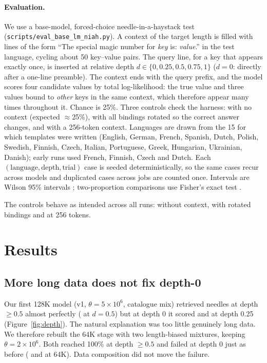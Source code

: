 \documentclass[11pt]{article}
\begin{document}
\paragraph{Evaluation.} We use a base-model, forced-choice needle-in-a-haystack test (\nolinkurl{scripts/eval_base_lm_niah.py}). A context of the target length is filled with lines of the form ``The special magic number for \emph{key} is: \emph{value}.'' in the test language, cycling about 50 key--value pairs. The query line, for a key that appears exactly once, is inserted at relative depth $d\in\{0, 0.25, 0.5, 0.75, 1\}$ ($d{=}0$: directly after a one-line preamble). The context ends with the query prefix, and the model scores four candidate values by total log-likelihood: the true value and three values bound to \emph{other} keys in the same context, which therefore appear many times throughout it. Chance is 25\%. Three controls check the harness: with no context (expected $\approx$25\%), with all bindings rotated so the correct answer changes, and with a 256-token context. Languages are drawn from the 15 for which templates were written (English, German, French, Spanish, Dutch, Polish, Swedish, Finnish, Czech, Italian, Portuguese, Greek, Hungarian, Ukrainian, Danish); early runs used French, Finnish, Czech and Dutch. Each $(\text{language}, \text{depth}, \text{trial})$ case is seeded deterministically, so the same cases recur across models and duplicated cases across jobs are counted once. Intervals are Wilson 95\% intervals \citep{wilson1927}; two-proportion comparisons use Fisher's exact test \citep{agresti2002}.

\begin{table}[htbp]
\centering
\small
\caption{Every evaluated checkpoint and its accuracy by needle depth at its evaluation length $L$ (all evaluated languages pooled). Tokens: tokens in the final stage. The three sweep arms start from the same 64K checkpoint (length-biased A).}
\label{tab:runs}
\resizebox{\linewidth}{!}{}
\end{table}

The controls behave as intended across all runs: \ctrlNoCtx{} without context, \ctrlShuffled{} with rotated bindings and \ctrlShort{} at 256 tokens.

\section{Results}

\subsection{More long data does not fix depth-0}
\label{sec:data}
Our first 128K model (v1, $\theta=5\times10^6$, catalogue mix) retrieved needles at depth $\ge0.5$ almost perfectly (\vOneHalf{} at $d{=}0.5$) but at depth 0 it scored \dzFracVOne{} and at depth 0.25 \vOneQuarter{} (Figure~\ref{fig:depth}). The natural explanation was too little genuinely long data. We therefore rebuilt the 64K stage with two length-biased mixtures, keeping $\theta=2\times10^6$. Both reached 100\% at depth $\ge0.5$ and failed at depth 0 just as before (\dataA{} and \dataB{} at 64K). Data composition did not move the failure.
\end{document}
